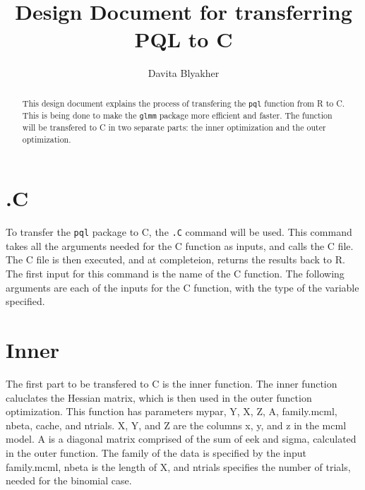 \documentclass{article}
\title{Design Document for transferring PQL to C}
\author{Davita Blyakher}
\begin{document}
\maketitle{}

\begin{abstract}
This design document explains the process of transfering the \texttt{pql} function from R to C. This is being done to make the \texttt{glmm} package more efficient and faster. The function will be transfered to C in two separate parts: the inner optimization and the outer optimization. 
\end{abstract}

\section{.C}
To transfer the \texttt{pql} package to C, the \texttt{.C} command will be used. This command takes all the arguments needed for the C function as inputs, and calls the C file. The C file is then executed, and at completeion, returns the results back to R. The first input for this command is the name of the C function. The following arguments are each of the inputs for the C function, with the type of the variable specified. 

\section {Inner}
The first part to be transfered to C is the inner function. The inner function caluclates the Hessian matrix, which is then used in the outer function optimization. This function has parameters mypar, Y, X, Z, A, family.mcml, nbeta, cache, and ntrials. X, Y, and Z are the columns x, y, and z in the mcml model. A is a diagonal matrix comprised of the sum of eek and sigma, calculated in the outer function. The family of the data is specified by the input family.mcml, nbeta is the length of X, and ntrials specifies the number of trials, needed for the binomial case.   
\end{document}
